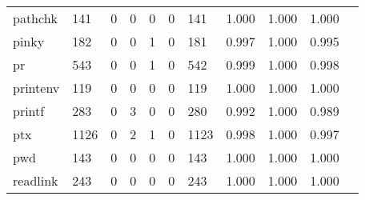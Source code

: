 \begin{longtable}{lp{1.10cm}p{1.10cm}p{1.10cm}p{1.10cm}p{1.10cm}p{1.10cm}p{1.10cm}p{1.10cm}p{1.10cm}p{1.10cm}}
pathchk   &                    141 &                                  0 &                                 0 &                                0 &                                 0 &                             141 &                             1.000 &                                 1.000 &                               1.000 \\
pinky     &                    182 &                                  0 &                                 0 &                                1 &                                 0 &                             181 &                             0.997 &                                 1.000 &                               0.995 \\
pr        &                    543 &                                  0 &                                 0 &                                1 &                                 0 &                             542 &                             0.999 &                                 1.000 &                               0.998 \\
printenv  &                    119 &                                  0 &                                 0 &                                0 &                                 0 &                             119 &                             1.000 &                                 1.000 &                               1.000 \\
printf    &                    283 &                                  0 &                                 3 &                                0 &                                 0 &                             280 &                             0.992 &                                 1.000 &                               0.989 \\
ptx       &                   1126 &                                  0 &                                 2 &                                1 &                                 0 &                            1123 &                             0.998 &                                 1.000 &                               0.997 \\
pwd       &                    143 &                                  0 &                                 0 &                                0 &                                 0 &                             143 &                             1.000 &                                 1.000 &                               1.000 \\
readlink  &                    243 &                                  0 &                                 0 &                                0 &                                 0 &                             243 &                             1.000 &                                 1.000 &                               1.000 \\

\end{longtable}
